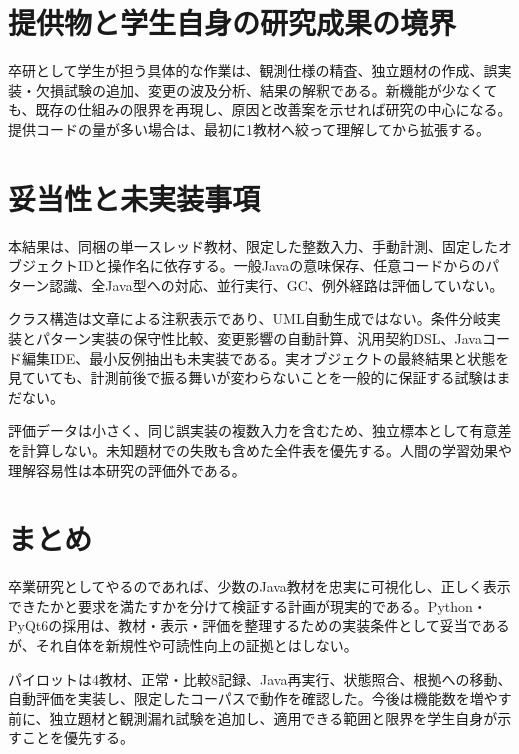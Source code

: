 \documentclass[a4paper,11pt]{ltjsarticle}
\begin{document}
\section{提供物と学生自身の研究成果の境界}

卒研として学生が担う具体的な作業は、観測仕様の精査、独立題材の作成、誤実装・欠損試験の追加、変更の波及分析、結果の解釈である。新機能が少なくても、既存の仕組みの限界を再現し、原因と改善案を示せれば研究の中心になる。提供コードの量が多い場合は、最初に1教材へ絞って理解してから拡張する。

\section{妥当性と未実装事項}
本結果は、同梱の単一スレッド教材、限定した整数入力、手動計測、固定したオブジェクトIDと操作名に依存する。一般Javaの意味保存、任意コードからのパターン認識、全Java型への対応、並行実行、GC、例外経路は評価していない。

クラス構造は文章による注釈表示であり、UML自動生成ではない。条件分岐実装とパターン実装の保守性比較、変更影響の自動計算、汎用契約DSL、Javaコード編集IDE、最小反例抽出も未実装である。実オブジェクトの最終結果と状態を見ていても、計測前後で振る舞いが変わらないことを一般的に保証する試験はまだない。

評価データは小さく、同じ誤実装の複数入力を含むため、独立標本として有意差を計算しない。未知題材での失敗も含めた全件表を優先する。人間の学習効果や理解容易性は本研究の評価外である。

\section{まとめ}
卒業研究としてやるのであれば、少数のJava教材を忠実に可視化し、正しく表示できたかと要求を満たすかを分けて検証する計画が現実的である。Python・PyQt6の採用は、教材・表示・評価を整理するための実装条件として妥当であるが、それ自体を新規性や可読性向上の証拠とはしない。

パイロットは4教材、正常・比較8記録、Java再実行、状態照合、根拠への移動、自動評価を実装し、限定したコーパスで動作を確認した。今後は機能数を増やす前に、独立題材と観測漏れ試験を追加し、適用できる範囲と限界を学生自身が示すことを優先する。

\appendix
\end{document}

